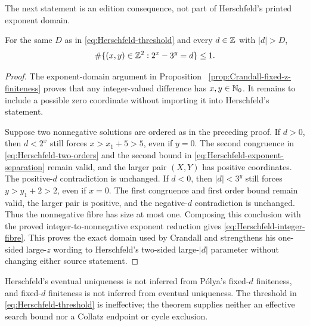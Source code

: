 The next statement is an edition consequence, not part of Herschfeld's
printed exponent domain.

\begin{proposition}
\label{prop:Herschfeld-integer-eventual-uniqueness}
For the same $D$ as in \eqref{eq:Herschfeld-threshold} and every
$d\in\mathbb{Z}$ with $|d|>D$,
\begin{equation}
\label{eq:Herschfeld-integer-fibre}
 \#\{(x,y)\in\mathbb{Z}^2:2^x-3^y=d\}\leq1.
\end{equation}
\end{proposition}

\begin{proof}
The exponent-domain argument in Proposition~
\ref{prop:Crandall-fixed-z-finiteness} proves that any integer-valued
difference has $x,y\in\mathbb{N}_{0}$.  It remains to include a possible zero
coordinate without importing it into Herschfeld's statement.

Suppose two nonnegative solutions are ordered as in the preceding proof.  If
$d>0$, then $d<2^x$ still forces $x>x_1+5>5$, even if $y=0$.  The second
congruence in \eqref{eq:Herschfeld-two-orders} and the second bound in
\eqref{eq:Herschfeld-exponent-separation} remain valid, and the larger pair
$(X,Y)$ has positive coordinates.  The positive-$d$ contradiction is
unchanged.  If $d<0$, then $|d|<3^y$ still forces $y>y_1+2>2$, even if
$x=0$.  The first congruence and first order bound remain valid, the larger
pair is positive, and the negative-$d$ contradiction is unchanged.  Thus
the nonnegative fibre has size at most one.  Composing this conclusion with
the proved integer-to-nonnegative exponent reduction gives
\eqref{eq:Herschfeld-integer-fibre}.  This proves the exact domain used by
Crandall and strengthens his one-sided large-$z$ wording to Herschfeld's
two-sided large-$|d|$ parameter without changing either source statement.
\end{proof}

\begin{nonclaim}
Herschfeld's eventual uniqueness is not inferred from P\'olya's fixed-$d$
finiteness, and fixed-$d$ finiteness is not inferred from eventual
uniqueness.  The threshold in \eqref{eq:Herschfeld-threshold} is ineffective;
the theorem supplies neither an effective search bound nor a Collatz
endpoint or cycle exclusion.
\end{nonclaim}


